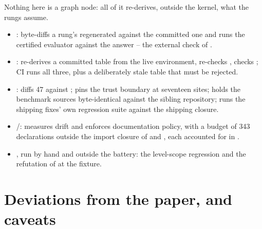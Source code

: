Nothing here is a graph node: all of it re-derives, outside the kernel, what the rungs assume.

\begin{itemize}
\item {}: byte-diffs a rung's regenerated  against the committed
one and runs the certified evaluator against the answer -- the external check of .
\item {}: re-derives a committed table from the live
environment, re-checks , checks ; CI runs all three, plus a
deliberately stale table that must be rejected.
\item {}: diffs 47  against ;
 pins the trust boundary at seventeen  sites; 
holds the benchmark sources byte-identical against the sibling repository;  runs the
shipping fixes' own regression suite against the shipping closure.
\item {}/: measures drift and enforces documentation policy,
with a budget of 343 declarations outside the import closure of  and
, each accounted for in .
\item {}, run by hand and outside the battery: the level-scope regression and
the refutation of  at the  fixture.
\end{itemize}

\section{Deviations from the paper, and caveats}
\label{sec:capstone:caveats}

